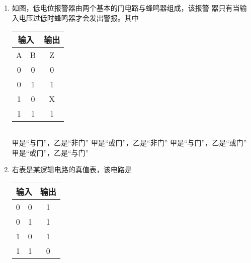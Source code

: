 
\begin{enumerate}
\item
{}
如图，低电位报警器由两个基本的门电路与蜂鸣器组成，该报警
器只有当输入电压过低时蜂鸣器才会发出警报。其中  

\begin{table}[h!]
\centering 
\begin{tabular}{|c|c|c|}
\hline 
\multicolumn{2}{|c|}{输入} & 输出
 \\
\hline
A & B &Z
 \\
\hline
0 & 0 & 0
 \\
\hline
0 & 1 &1
 \\
\hline
1 & 0 &X
 \\
\hline
1 & 1 &1\\ 
\hline 
\end{tabular}
\hfil
\begin{tabular}{c} 
 \\ 
\end{tabular}
\end{table} 


\fourchoices
{甲是“与门”，乙是“非门”}
{甲是“或门”，乙是“非门”}
{甲是“与门”，乙是“或门”}
{甲是“或门”，乙是“与门”}




\item 
{}
右表是某逻辑电路的真值表，该电路是  
\begin{table}[h!]
\centering 
\begin{tabular}{|c|c|c|}
\hline 
\multicolumn{2}{|c|}{输入} & 输出
 \\
\hline
0 & 0 & 1
 \\
\hline
0 & 1 & 1
 \\
\hline
1 & 0 & 1
 \\
\hline
1 & 1 & 0\\ 
\hline 
\end{tabular}
\end{table} 

\pfourchoices
{}
{}
{}
{}




\end{enumerate}
